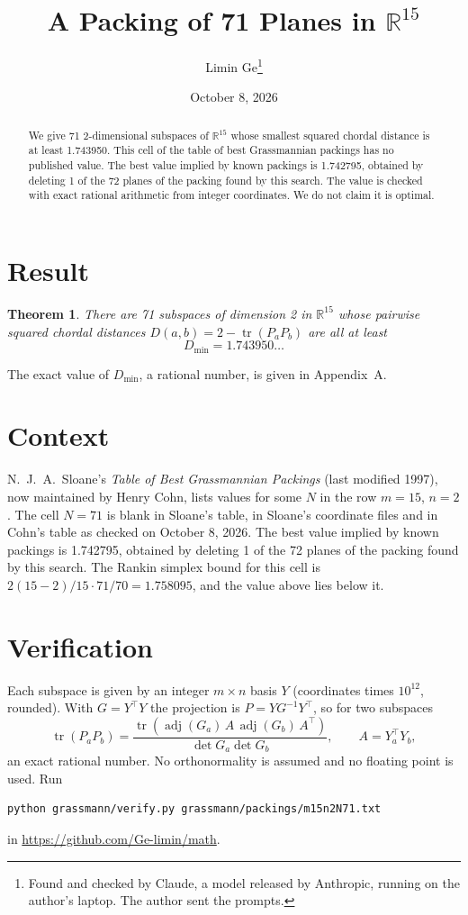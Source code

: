 \documentclass[11pt,a4paper]{article}
\title{A Packing of 71 Planes in $\mathbb{R}^{15}$}
\author{Limin Ge\thanks{Found and checked by Claude, a model released by Anthropic, running on the author's laptop. The author sent the prompts.}}
\date{October 8, 2026}
\newtheorem*{theorem}{Theorem}
\begin{document}
\maketitle
\begin{abstract}
We give 71 2-dimensional subspaces of $\mathbb{R}^{15}$ whose smallest squared chordal distance is at least 1.743950. This cell of the table of best Grassmannian packings has no published value. The best value implied by known packings is 1.742795, obtained by deleting 1 of the 72 planes of the packing found by this search. The value is checked with exact rational arithmetic from integer coordinates. We do not claim it is optimal.
\end{abstract}

\section{Result}
\begin{theorem}
There are 71 subspaces of dimension 2 in $\mathbb{R}^{15}$ whose pairwise squared chordal distances $D(a,b) = 2 - \operatorname{tr}(P_aP_b)$ are all at least
\[ D_{\min} = 1.743950\ldots \]
\end{theorem}
The exact value of $D_{\min}$, a rational number, is given in Appendix~A.


\section{Context}
N.~J.~A.~Sloane's \emph{Table of Best Grassmannian Packings} (last modified 1997), now maintained by Henry Cohn, lists values for some $N$ in the row $m=15$, $n=2$. The cell $N=71$ is blank in Sloane's table, in Sloane's coordinate files and in Cohn's table as checked on October 8, 2026. The best value implied by known packings is 1.742795, obtained by deleting 1 of the 72 planes of the packing found by this search. The Rankin simplex bound for this cell is $2(15-2)/15\cdot 71/70 = 1.758095$, and the value above lies below it.


\section{Verification}
Each subspace is given by an integer $m\times n$ basis $Y$ (coordinates times $10^{12}$, rounded). With $G=Y^\top Y$ the projection is $P=YG^{-1}Y^\top$, so for two subspaces
\[ \operatorname{tr}(P_aP_b)=\frac{\operatorname{tr}(\operatorname{adj}(G_a)\,A\,\operatorname{adj}(G_b)\,A^\top)}{\det G_a\det G_b},\qquad A=Y_a^\top Y_b, \]
an exact rational number. No orthonormality is assumed and no floating point is used. Run
\begin{verbatim}
python grassmann/verify.py grassmann/packings/m15n2N71.txt
\end{verbatim}
in \url{https://github.com/Ge-limin/math}.
\end{document}

